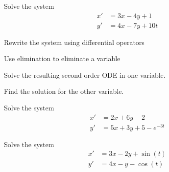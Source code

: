 \begin{applicationActivities}

\begin{activity}{20}
Solve the system
\begin{alignat*}{2}
x'&=3x-4y+1\\
y'&= 4x-7y+10t
\end{alignat*}
\begin{subactivity}
Rewrite the system using differential operators
\end{subactivity}
\begin{subactivity}
Use elimination to eliminate a variable
\end{subactivity}
\begin{subactivity}
Solve the resulting second order ODE in one variable.
\end{subactivity}
\begin{subactivity}
Find the solution for the other variable.
\end{subactivity}
\end{activity}

\begin{activity}{20}
Solve the system
\begin{alignat*}{2}
x'&=2x+6y-2\\
y'&= 5x+3y+5-e^{-3t}
\end{alignat*}
\end{activity}

\begin{activity}{15}
Solve the system
\begin{alignat*}{2}
x'&=3x-2y+\sin(t)\\
y'&= 4x-y-\cos(t)
\end{alignat*}
\end{activity}

\end{applicationActivities}
